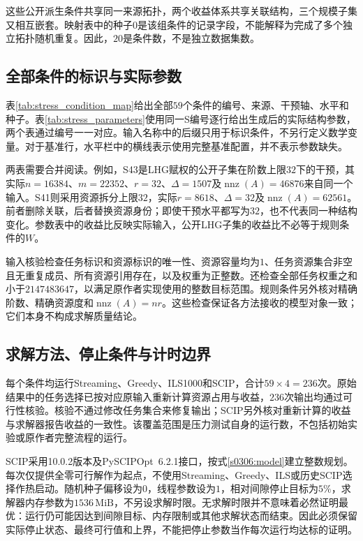 这些公开派生条件共享同一来源拓扑，两个收益体系共享关联结构，三个规模子集又相互嵌套。映射表中的种子$0$是该组条件的记录字段，不能解释为完成了多个独立拓扑随机重复。因此，$20$是条件数，不是独立数据集数。

\subsection{全部条件的标识与实际参数}

表\ref{tab:stress_condition_map}给出全部$59$个条件的编号、来源、干预轴、水平和种子。表\ref{tab:stress_parameters}使用同一S编号逐行给出生成后的实际结构参数，两个表通过编号一一对应。输入名称中的后缀只用于标识条件，不另行定义数学变量。对于基准行，水平栏中的横线表示使用完整基准配置，并不表示参数缺失。





两表需要合并阅读。例如，S43是LHG赋权的公开子集在阶数上限$32$下的干预，其实际$n=16384$、$m=22352$、$r=32$、$\Delta=1507$及$\operatorname{nnz}(A)=46876$来自同一个输入。S41则采用资源拆分上限$32$，实际$r=8618$、$\Delta=32$及$\operatorname{nnz}(A)=62561$。前者删除关联，后者替换资源身份；即使干预水平都写为$32$，也不代表同一种结构变化。参数表中的收益比反映实际输入，公开LHG子集的收益比不必等于规则条件的$W$。

输入核验检查任务标识和资源标识的唯一性、资源容量均为$1$、任务资源集合非空且无重复成员、所有资源引用存在，以及权重为正整数。还检查全部任务权重之和小于$2147483647$，以满足原作者实现使用的整数目标范围。规则条件另外核对精确阶数、精确资源度和$\operatorname{nnz}(A)=nr$。这些检查保证各方法接收的模型对象一致；它们本身不构成求解质量结论。

\subsection{求解方法、停止条件与计时边界}

每个条件均运行Streaming、Greedy、ILS1000和SCIP，合计$59\times4=236$次。原始结果中的任务选择已按对应原输入重新计算资源占用与收益，$236$次输出均通过可行性核验。核验不通过修改任务集合来修复输出；SCIP另外核对重新计算的收益与求解器报告收益的一致性。该覆盖范围是压力测试自身的运行数，不包括初始实验或原作者完整流程的运行。

SCIP采用10.0.2版本及PySCIPOpt~6.2.1接口，按式\eqref{s0306:model}建立整数规划。每次仅提供全零可行解作为起点，不使用Streaming、Greedy、ILS或历史SCIP选择作热启动。随机种子偏移设为$0$，线程参数设为$1$，相对间隙停止目标为$5\%$，求解器内存参数为$1536\,\mathrm{MiB}$，不另设求解时限。无求解时限并不意味着必然证明最优：运行仍可能因达到间隙目标、内存限制或其他求解状态而结束。因此必须保留实际停止状态、最终可行值和上界，不能把停止参数当作每次运行均达标的证明。

